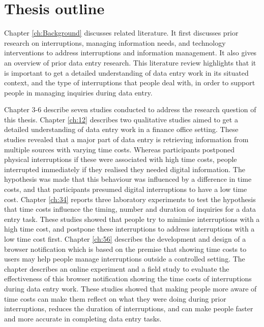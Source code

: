 \section{Thesis outline}
Chapter \ref{ch:Background} discusses related literature. It first discusses prior research on interruptions, managing information needs, and technology interventions to address interruptions and information management. It also gives an overview of prior data entry research. This literature review highlights that it is important to get a detailed understanding of data entry work in its situated context, and the type of interruptions that people deal with, in order to support people in managing inquiries during data entry. 

Chapter 3-6 describe seven studies conducted to address the research question of this thesis. Chapter \ref{ch:12} describes two qualitative studies aimed to get a detailed understanding of data entry work in a finance office setting. These studies revealed that a major part of data entry is retrieving information from multiple sources with varying time costs. Whereas participants postponed physical interruptions if these were associated with high time costs, people interrupted immediately if they realised they needed digital information. The hypothesis was made that this behaviour was influenced by a difference in time costs, and that participants presumed digital interruptions to have a low time cost. Chapter \ref{ch:34} reports three laboratory experiments to test the hypothesis that time costs influence the timing, number and duration of inquiries for a data entry task. These studies showed that people try to minimise interruptions with a high time cost, and postpone these interruptions to address interruptions with a low time cost first. %
Chapter \ref{ch:56} describes the development and design of a browser notification which is based on the premise that showing time costs to users may help people manage interruptions outside a controlled setting. The chapter describes an online experiment and a field study to evaluate the effectiveness of this browser notification showing the time costs of interruptions during data entry work. These studies showed that making people more aware of time costs can make them reflect on what they were doing during prior interruptions, reduces the duration of interruptions, and can make people faster and more accurate in completing data entry tasks.

